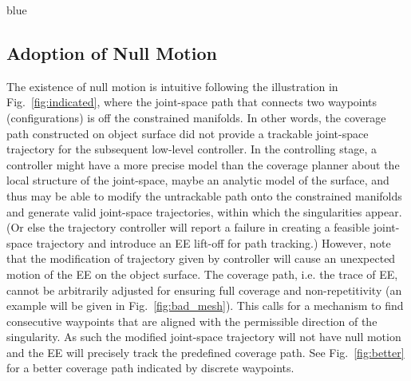 \documentclass[Afour,sageh,times]{sagej}
\begin{document}
\begin{color}{blue}


\subsection{Adoption of Null Motion}
The existence of null motion is intuitive following the illustration in Fig.~\ref{fig:indicated}, where the joint-space path that connects two waypoints (configurations) is off the constrained manifolds. 
In other words, the coverage path constructed on object surface did not provide a trackable joint-space trajectory for the subsequent low-level controller. 
In the controlling stage, a controller might have a more precise model than the coverage planner about the local structure of the joint-space, maybe an analytic model of the surface, and thus may be able to modify the untrackable path onto the constrained manifolds and generate valid joint-space trajectories, within which the singularities appear. 
(Or else the trajectory controller will report a failure in creating a feasible joint-space trajectory and introduce an EE lift-off for path tracking.)
However, note that the modification of trajectory given by controller will cause an unexpected motion of the EE on the object surface. 
The coverage path, i.e. the trace of EE, cannot be arbitrarily adjusted for ensuring full coverage and non-repetitivity (an example will be given in Fig.~\ref{fig:bad_mesh}). 
This calls for a mechanism to find consecutive waypoints that are aligned with the permissible direction of the singularity. 
As such the modified joint-space trajectory will not have null motion and the EE will precisely track the predefined coverage path. 
See Fig.~\ref{fig:better} for a better coverage path indicated by discrete waypoints. 
\end{color}
\end{document}
